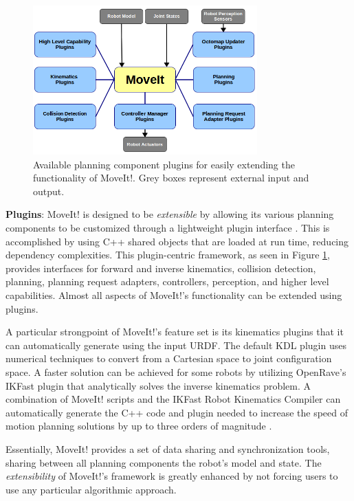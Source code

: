 \documentclass[10pt,journal,compsoc]{joser1}
\begin{document}
{\begin{figure}[!t]
\centering
\includegraphics[width=3.4in]{coleman_20131110_f10}
\caption{Available planning component plugins for easily extending the
functionality of MoveIt!. Grey boxes represent external input and output.}
\label{fig:moveit_plugins}
\end{figure}

{\bf Plugins}: MoveIt! is designed to be \textit{extensible} by allowing its
various planning components to be customized through a lightweight plugin
interface \cite{moveit}. This is accomplished by using C++ shared objects that
are loaded at run time, reducing dependency complexities. This plugin-centric
framework, as seen in Figure \ref{fig:moveit_plugins}, provides interfaces for
forward and inverse kinematics, collision detection, planning, planning request
adapters, controllers, perception, and higher level capabilities. Almost
all aspects of MoveIt!'s functionality can be extended using plugins.

A particular strongpoint of MoveIt!'s feature set is its kinematics plugins that
it can automatically generate using the input URDF. The default KDL plugin uses
numerical techniques to convert from a Cartesian space to joint configuration
space. A faster solution can be achieved for some robots by utilizing OpenRave's
IKFast \cite{ikfast} plugin that analytically solves the inverse kinematics
problem. A combination of MoveIt! scripts and the IKFast Robot Kinematics
Compiler can automatically generate the C++ code and plugin needed to increase
the speed of motion planning solutions by up to three orders of magnitude
\cite{ikfast}.

Essentially, MoveIt! provides a set of data sharing and synchronization tools,
sharing between all planning components the robot's model and state. The
\textit{extensibility} of MoveIt!'s framework is greatly enhanced by not forcing
users to use any particular algorithmic approach. 

}
\end{document}
